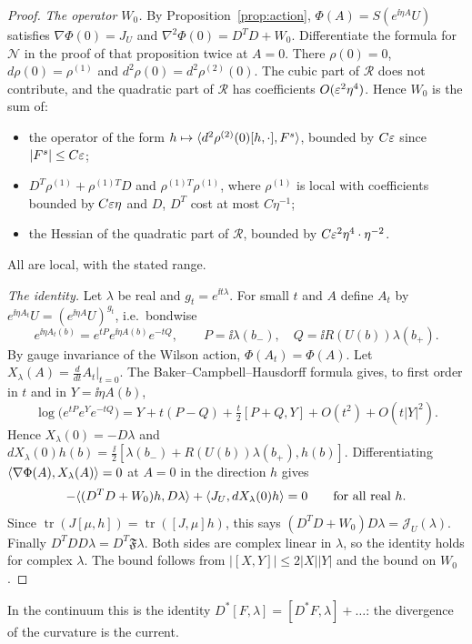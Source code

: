 \begin{proof}
\emph{The operator $W_0$.} By Proposition~\ref{prop:action}, $\Phi(A)=S(e^{\ii\eta A}U)$ satisfies $\nabla\Phi(0)=J_U$ and $\nabla^2\Phi(0)=D^TD+W_0$. Differentiate the formula for $\mathcal N$ in the proof of that proposition twice at $A=0$. There $\rho(0)=0$, $d\rho(0)=\rho^{(1)}$ and $d^2\rho(0)=d^2\rho^{(2)}(0)$. The cubic part of $\mathcal R$ does not contribute, and the quadratic part of $\mathcal R$ has coefficients $O(\varepsilon^2\eta^4)$. Hence $W_0$ is the sum of:
\begin{itemize}
\item the operator of the form $h\mapsto\langle d^2\rho^{(2)}(0)[h,\cdot],F^s\rangle$, bounded by $C\varepsilon$ since $|F^s|\le C\varepsilon$;
\item $D^T\rho^{(1)}+\rho^{(1)T}D$ and $\rho^{(1)T}\rho^{(1)}$, where $\rho^{(1)}$ is local with coefficients bounded by $C\varepsilon\eta$ and $D$, $D^T$ cost at most $C\eta^{-1}$;
\item the Hessian of the quadratic part of $\mathcal R$, bounded by $C\varepsilon^2\eta^4\cdot\eta^{-2}$.
\end{itemize}
All are local, with the stated range.

\emph{The identity.} Let $\lambda$ be real and $g_t=e^{\ii t\lambda}$. For small $t$ and $A$ define $A_t$ by $e^{\ii\eta A_t}U=(e^{\ii\eta A}U)^{g_t}$, i.e.\ bondwise
\[
e^{\ii\eta A_t(b)}=e^{tP}e^{\ii\eta A(b)}e^{-tQ},\qquad P=\ii\lambda(b_-),\quad Q=\ii R(U(b))\lambda(b_+).
\]
By gauge invariance of the Wilson action, $\Phi(A_t)=\Phi(A)$. Let $X_\lambda(A)=\frac{d}{dt}A_t|_{t=0}$. The Baker--Campbell--Hausdorff formula gives, to first order in $t$ and in $Y=\ii\eta A(b)$,
\[
\log\big(e^{tP}e^Ye^{-tQ}\big)=Y+t(P-Q)+\tfrac t2[P+Q,Y]+O(t^2)+O(t|Y|^2).
\]
Hence $X_\lambda(0)=-D\lambda$ and $dX_\lambda(0)h(b)=\frac\ii2[\lambda(b_-)+R(U(b))\lambda(b_+),h(b)]$. Differentiating $\langle \nabla\Phi(A),X_\lambda(A)\rangle=0$ at $A=0$ in the direction $h$ gives
\[
-\langle (D^TD+W_0)h,D\lambda\rangle+\langle J_U,dX_\lambda(0)h\rangle=0\qquad\text{for all real }h .
\]
Since $\operatorname{tr}(J[\mu,h])=\operatorname{tr}([J,\mu]h)$, this says $(D^TD+W_0)D\lambda=\mathcal J_U(\lambda)$. Finally $D^TDD\lambda=D^T\mathfrak F\lambda$. Both sides are complex linear in $\lambda$, so the identity holds for complex $\lambda$. The bound follows from $|[X,Y]|\le2|X||Y|$ and the bound on $W_0$.
\end{proof}

In the continuum this is the identity $D^*[F,\lambda]=[D^*F,\lambda]+\dots$: the divergence of the curvature is the current.

